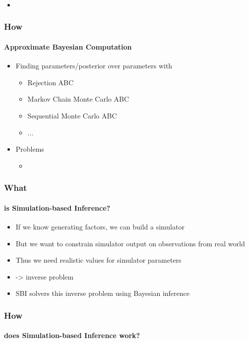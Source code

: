 \documentclass[9pt]{beamer}
\begin{document}
\begin{frame}
\frametitle{}
\framesubtitle{}
\begin{itemize}
	\item 
\end{itemize}
\end{frame} 



\begin{frame}
\frametitle{How}
\framesubtitle{Approximate Bayesian Computation}
\begin{itemize}
	\item Finding parameters/posterior over parameters with
	\begin{itemize}
		\item Rejection ABC
		\item Markov Chain Monte Carlo ABC
		\item Sequential Monte Carlo ABC
		\item ...
	\end{itemize}
	\item Problems
	\begin{itemize}
		\item 
	\end{itemize}
\end{itemize}
\end{frame} 



\begin{frame}
\frametitle{What}
\framesubtitle{is Simulation-based Inference?}
\begin{itemize}
	\item If we know generating factors, we can build a simulator
	\item But we want to constrain simulator output on observations from real world
	\item Thus we need realistic values for simulator parameters
	\item -> inverse problem
	\item SBI solvers this inverse problem using Bayesian inference
\end{itemize}
\end{frame} 


\begin{frame}
\frametitle{How}
\framesubtitle{does Simulation-based Inference work?}
\begin{figure}
\end{figure}
\end{frame} 
\end{document}

